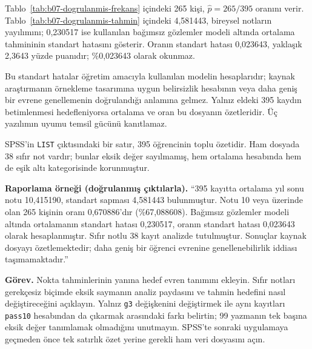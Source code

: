 \begin{outputguidebox}
Tablo~\ref{tab:b07-dogrulanmis-frekans} içindeki 265 kişi,
$\hat p=265/395$ oranını verir. Tablo~\ref{tab:b07-dogrulanmis-tahmin}
içindeki 4,581443, bireysel notların yayılımını; 0,230517 ise kullanılan
bağımsız gözlemler modeli altında ortalama tahmininin standart hatasını
gösterir. Oranın standart hatası 0,023643, yaklaşık 2,3643 yüzde puanıdır;
\%0,023643 olarak okunmaz.

Bu standart hatalar öğretim amacıyla kullanılan modelin hesaplarıdır;
kaynak araştırmanın örnekleme tasarımına uygun belirsizlik hesabının
veya daha geniş bir evrene genellemenin doğrulandığı anlamına gelmez.
Yalnız eldeki 395 kaydın betimlenmesi hedefleniyorsa ortalama ve oran
bu dosyanın özetleridir. Üç yazılımın uyumu temsil gücünü kanıtlamaz.

SPSS'in \texttt{LIST} çıktısındaki bir satır, 395 öğrencinin toplu
özetidir. Ham dosyada 38 sıfır not vardır; bunlar eksik değer sayılmamış,
hem ortalama hesabında hem de eşik altı kategorisinde korunmuştur.
\end{outputguidebox}

\textbf{Raporlama örneği (doğrulanmış çıktılarla).}
``395 kayıtta ortalama yıl sonu notu 10,415190, standart sapması
4,581443 bulunmuştur. Notu 10 veya üzerinde olan 265 kişinin oranı
0,670886'dır (\%67,088608). Bağımsız gözlemler modeli altında
ortalamanın standart hatası 0,230517, oranın standart hatası 0,023643
olarak hesaplanmıştır. Sıfır notlu 38 kayıt analizde tutulmuştur.
Sonuçlar kaynak dosyayı özetlemektedir; daha geniş bir öğrenci evrenine
genellenebilirlik iddiası taşımamaktadır.''


\textbf{Görev.} Nokta tahminlerinin yanına hedef evren tanımını ekleyin.
Sıfır notları gerekçesiz biçimde eksik saymanın analiz paydasını ve
tahmin hedefini nasıl değiştireceğini açıklayın. Yalnız \texttt{g3}
değişkenini değiştirmek ile aynı kayıtları \texttt{pass10} hesabından da
çıkarmak arasındaki farkı belirtin; 99 yazmanın tek başına eksik değer
tanımlamak olmadığını unutmayın. SPSS'te sonraki uygulamaya geçmeden
önce tek satırlık özet yerine gerekli ham veri dosyasını açın.